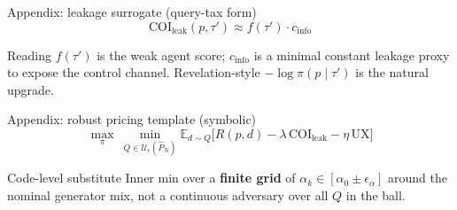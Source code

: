 \begin{frame}{Appendix: leakage surrogate (query-tax form)}
  \small
  \[
    \mathrm{COI}_{\mathrm{leak}}(p,\tau') \approx f(\tau')\cdot c_{\mathrm{info}}
  \]
  \begin{block}{Reading}
    \(f(\tau')\) is the weak agent score; \(c_{\mathrm{info}}\) is a minimal constant leakage proxy to expose the control channel. Revelation-style \(-\log \pi(p\mid\tau')\) is the natural upgrade.
  \end{block}
\end{frame}

\begin{frame}{Appendix: robust pricing template (symbolic)}
  \footnotesize
  \[
    \max_\pi\ \min_{Q\in\mathcal{U}_\epsilon(\hat{P}_N)} \mathbb{E}_{d\sim Q}\bigl[ R(p,d) - \lambda\,\mathrm{COI}_{\mathrm{leak}} - \eta\,\mathrm{UX} \bigr]
  \]
  \begin{alertblock}{Code-level substitute}
    Inner min over a \textbf{finite grid} of \(\alpha_k\in[\alpha_0\pm\epsilon_\alpha]\) around the nominal generator mix, not a continuous adversary over all \(Q\) in the ball.
  \end{alertblock}
\end{frame}

